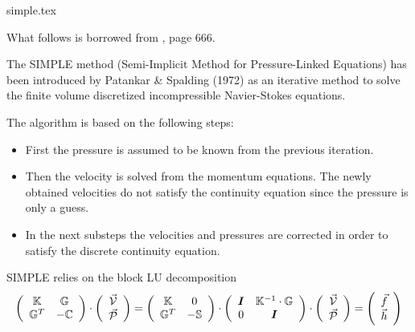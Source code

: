 \begin{flushright} {\tiny {\color{gray} simple.tex}} \end{flushright}


What follows is borrowed from , page 666. 


The SIMPLE method (Semi-Implicit Method for Pressure-Linked Equations)
has been introduced by Patankar \& Spalding (1972) \cite{pasp72} as an iterative method to solve
the finite volume discretized incompressible Navier-Stokes equations. 

The algorithm
is based on the following steps:
\begin{itemize}
\item First the pressure is assumed to be known from the previous iteration.
\item Then the velocity is solved from the momentum equations. The newly obtained
velocities do not satisfy the continuity equation since the pressure is only a
guess.
\item In the next substeps the velocities and pressures are corrected in order to
satisfy the discrete continuity equation.
\end{itemize}

SIMPLE relies on the block LU decomposition
\begin{equation}
\left(
\begin{array}{cc}
{\mathbb{K}} & {\mathbb{G}} \\ {\mathbb{G}}^T & -{\mathbb{C}} 
\end{array}
\right)
\cdot
\left(
\begin{array}{c}
\vec{\cal V} \\ \vec{\cal P}
\end{array}
\right)
=
\left(
\begin{array}{cc}
{\mathbb{K}} & 0 \\ {\mathbb{G}}^T & -{\mathbb{S}}
\end{array}
\right)
\cdot
\left(
\begin{array}{cc}
{\bm I} & {\mathbb{K}}^{-1} \cdot {\mathbb{G}} \\
0 & {\bm I} 
\end{array}
\right)
\cdot
\left(
\begin{array}{c}
\vec{\cal V} \\ \vec{\cal P}
\end{array}
\right)
=
\left(
\begin{array}{c}
\vec{f} \\ \vec{h}
\end{array}
\right)
\end{equation}

